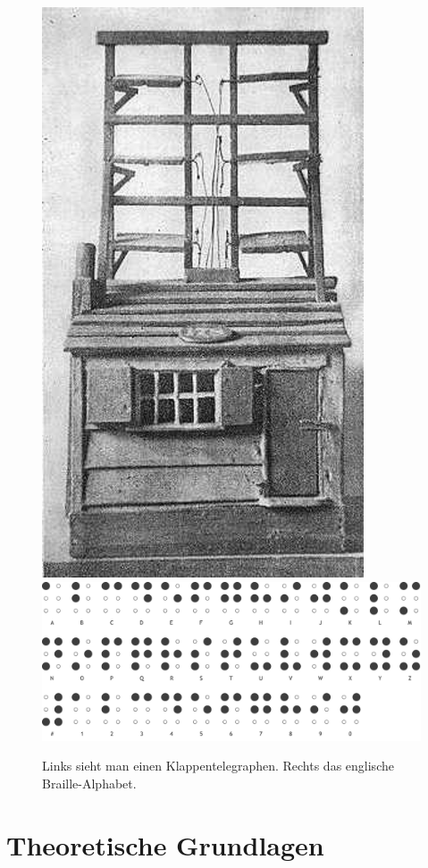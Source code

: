 \documentclass[a4paper,11pt]{scrartcl}%
\theoremstyle{change}
\theoremstyle{nonumberplain}
\theoremstyle{change}
\theoremstyle{nonumberplain}
\theoremstyle{change}
\theoremstyle{nonumberplain}
\begin{document}
	\begin{figure}[h]
	
		\includegraphics[scale=0.25]{./pics/shuttercabin}\cite{klappentelegraph}
		\hspace{25pt} 
	 	\includegraphics[scale=0.17]{./pics/braille}\cite{braille}
	 	\caption{Links sieht man einen Klappentelegraphen. Rechts das englische Braille-Alphabet. }
	  	\label{fig:braille}
	\end{figure}
\newpage
\section{Theoretische Grundlagen}
\end{document}
